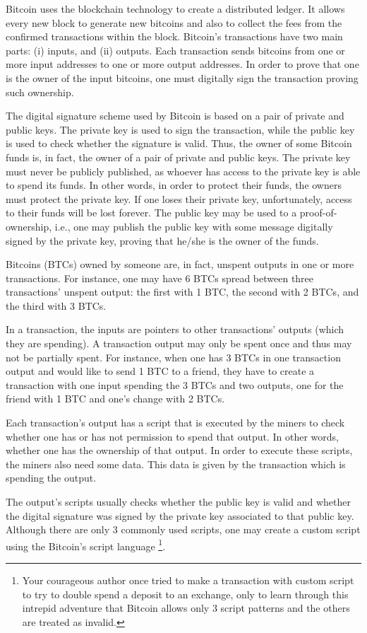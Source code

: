 Bitcoin uses the blockchain technology to create a distributed ledger. It allows every new block to generate new bitcoins and also to collect the fees from the confirmed transactions within the block. Bitcoin's transactions have two main parts: (i) inputs, and (ii) outputs. Each transaction sends bitcoins from one or more input addresses to one or more output addresses. In order to prove that one is the owner of the input bitcoins, one must digitally sign the transaction proving such ownership.

The digital signature scheme used by Bitcoin is based on a pair of private and public keys. The private key is used to sign the transaction, while the public key is used to check whether the signature is valid. Thus, the owner of some Bitcoin funds is, in fact, the owner of a pair of private and public keys. The private key must never be publicly published, as whoever has access to the private key is able to spend its funds. In other words, in order to protect their funds, the owners must protect the private key. If one loses their private key, unfortunately, access to their funds will be lost forever. The public key may be used to a proof-of-ownership, i.e., one may publish the public key with some message digitally signed by the private key, proving that he/she is the owner of the funds.

Bitcoins (BTCs) owned by someone are, in fact, unspent outputs in one or more transactions. For instance, one may have 6 BTCs spread between three transactions' unspent output: the first with 1 BTC, the second with 2 BTCs, and the third with 3 BTCs.

In a transaction, the inputs are pointers to other transactions' outputs (which they are spending). A transaction output may only be spent once and thus may not be partially spent. For instance, when one has 3 BTCs in one transaction output and would like to send 1 BTC to a friend, they have to create a transaction with one input spending the 3 BTCs and two outputs, one for the friend with 1 BTC and one's change with 2 BTCs.

Each transaction's output has a script that is executed by the miners to check whether one has or has not permission to spend that output. In other words, whether one has the ownership of that output. In order to execute these scripts, the miners also need some data. This data is given by the transaction which is spending the output.

The output's scripts usually checks whether the public key is valid and whether the digital signature was signed by the private key associated to that public key. Although there are only 3 commonly used scripts, one may create a custom script using the Bitcoin's script language \footnote{Your courageous author once tried to make a transaction with custom script to try to double spend a deposit to an exchange, only to learn through this intrepid adventure that Bitcoin allows only 3 script patterns and the others are treated as invalid.}.

